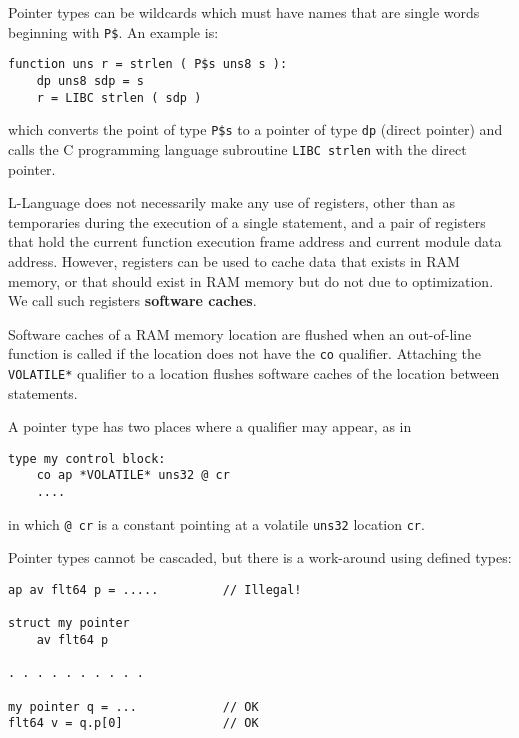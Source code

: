 \documentclass[12pt]{article}
\newcommand{\skey}[2]{{\rm \bfseries #1#2}}
\newenvironment{indpar}[1][0.3in]%
	{\begin{list}{}%
		     {\setlength{\itemsep}{0in}%
		      \setlength{\topsep}{0in}%
		      \setlength{\parsep}{1ex}%
		      \setlength{\labelwidth}{#1}%
		      \setlength{\leftmargin}{#1}%
		      \addtolength{\leftmargin}{\labelsep}}%
	 \item}%
	{\end{list}}
\begin{document}
Pointer types can be wildcards which must have names that are
single words beginning with {\tt P\$}.  An example is:

\begin{indpar}\begin{verbatim}
function uns r = strlen ( P$s uns8 s ):
    dp uns8 sdp = s
    r = LIBC strlen ( sdp )
\end{verbatim}\end{indpar}

which converts the point of type {\tt P\$s} to a pointer of
type {\tt dp} (direct pointer) and calls the C programming
language subroutine {\tt LIBC strlen} with the direct pointer.

L-Language does not necessarily make any use of registers, other
than as temporaries during the execution of a single statement,
and a pair of registers that hold the current function
execution frame address and current module data address.
However, registers can be used to cache data that exists in
RAM memory, or that should exist in RAM memory but do not
due to optimization.  We call such registers
\skey{software cach}{es}.

Software caches of a RAM memory location are flushed when an out-of-line
function is called if the location does not have the {\tt co} qualifier.
Attaching the {\tt *VOLATILE*} qualifier to a location
flushes software caches of the location between statements.

A pointer type
has two places where a qualifier may appear, as in

\begin{indpar}\begin{verbatim}
type my control block:
    co ap *VOLATILE* uns32 @ cr
    ....
\end{verbatim}\end{indpar}
in which {\tt @ cr} is a constant pointing at a volatile
{\tt uns32} location {\tt cr}.

Pointer types cannot be cascaded, but there is a work-around
using defined types:
\begin{indpar}\begin{verbatim}
ap av flt64 p = .....         // Illegal!

struct my pointer
    av flt64 p

. . . . . . . . . .

my pointer q = ...            // OK
flt64 v = q.p[0]              // OK
\end{verbatim}\end{indpar}
\end{document}
